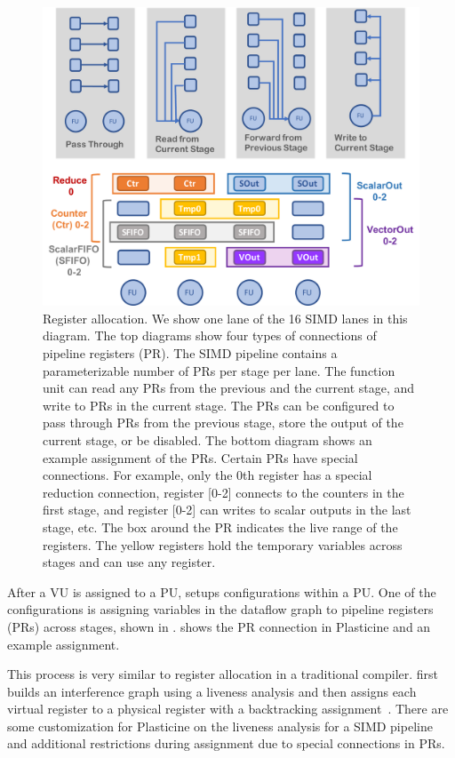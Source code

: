 \begin{figure}
  \centering
  \includegraphics[width=0.6\columnwidth]{figs/regalloc.pdf}
  \caption[Register allocation]{
    Register allocation. We show one lane of the 16 SIMD lanes in this diagram. 
    The top diagrams show four types of connections of pipeline registers (PR). The SIMD pipeline contains a
    parameterizable number of PRs per stage per lane. 
    The function unit can read any PRs from the previous and the current stage, and write to PRs in the current stage.
    The PRs can be configured to pass through PRs from the previous stage, store the output of the current stage, or be disabled.
    The bottom diagram shows an example assignment of the PRs.
    Certain PRs have special connections. 
    For example, only the 0th register has a special reduction connection, 
    register [0-2] connects to the counters in the first stage, and register
    [0-2] can writes to scalar outputs in the last stage, etc.
    The box around the PR indicates the live range of the registers.
    The yellow registers hold the temporary variables across stages and can use any register.
  }
  \label{fig:regalloc}
\end{figure}

After a VU is assigned to a PU, \name setups configurations within a PU.
One of the configurations is assigning variables in the dataflow graph to pipeline registers
(PRs) across stages, shown in .
 shows the PR connection in Plasticine and an example assignment.

This process is very similar to register allocation in a traditional compiler.
\name first builds an interference graph using a liveness analysis and then assigns each virtual register to a
physical register with a backtracking assignment~\cite{regalloc}.
There are some customization for Plasticine on the liveness analysis for a SIMD pipeline and
additional restrictions during assignment due to special connections in PRs.

